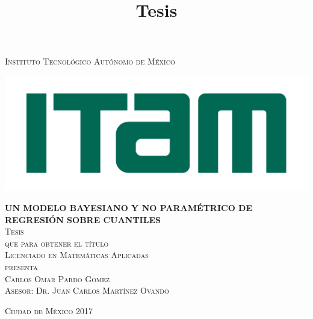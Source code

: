 \documentclass[letterpaper,onside,11pt,review,usenames,dvipsnames]{report}
\begin{document}
\pagestyle{empty} %

\title{Tesis} %

\begin{titlepage}
\begin{center}

\textsc{\Large Instituto Tecnol\'ogico Aut\'onomo de M\'exico}\\[2em]

\begin{center}
	\includegraphics[width=\textwidth]{Figures/Miscellaneous/logo-ITAM.png}
\end{center}

\vspace{2em}

{\sc \large {\bf UN MODELO BAYESIANO Y NO PARAM\'ETRICO DE REGRESI\'ON SOBRE CUANTILES}}\\[4em]

\textsc{\large Tesis}\\[1em]

\textsc{que para obtener el t\'itulo}\\[1em]

\textsc{Licenciado en Matem\'aticas Aplicadas}\\[1em]

\textsc{presenta}\\[1em]

\textsc{\Large Carlos Omar Pardo Gomez}\\[1em]

\textsc{\large Asesor: Dr. Juan Carlos Mart\'inez Ovando}

\end{center}

\vspace*{\fill}
\textsc{Ciudad de M\'exico \hspace*{\fill} 2017}

\end{titlepage}
\end{document}
